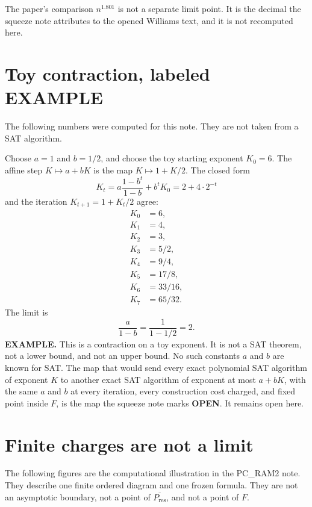 \documentclass{article}
\begin{document}
The paper's comparison \(n^{1.801}\) is not a separate limit point.
It is the decimal the squeeze note attributes to the opened Williams text, and it is not recomputed here.

\section{Toy contraction, labeled EXAMPLE}
The following numbers were computed for this note.
They are not taken from a SAT algorithm.

Choose \(a=1\) and \(b=1/2\), and choose the toy starting exponent \(K_0=6\).
The affine step \(K\mapsto a+bK\) is the map \(K\mapsto 1+K/2\).
The closed form
\[
K_t
=
a\frac{1-b^t}{1-b}+b^t K_0
=
2+4\cdot 2^{-t}
\]
and the iteration \(K_{t+1}=1+K_t/2\) agree:
\[
\begin{align*}
K_0&=6,\\
K_1&=4,\\
K_2&=3,\\
K_3&=5/2,\\
K_4&=9/4,\\
K_5&=17/8,\\
K_6&=33/16,\\
K_7&=65/32.
\end{align*}
\]
The limit is
\[
\frac{a}{1-b}=\frac{1}{1-1/2}=2.
\]
\textbf{EXAMPLE.}
This is a contraction on a toy exponent.
It is not a SAT theorem, not a lower bound, and not an upper bound.
No such constants \(a\) and \(b\) are known for SAT.
The map that would send every exact polynomial SAT algorithm of exponent \(K\) to another exact SAT algorithm of exponent at most \(a+bK\), with the same \(a\) and \(b\) at every iteration, every construction cost charged, and fixed point inside \(F\), is the map the squeeze note marks \textbf{OPEN}.
It remains open here.

\section{Finite charges are not a limit}
The following figures are the computational illustration in the PC\_RAM2 note.
They describe one finite ordered diagram and one frozen formula.
They are not an asymptotic boundary, not a point of \(\overline{P_{\mathrm{res}}}\), and not a point of \(F\).
\end{document}
